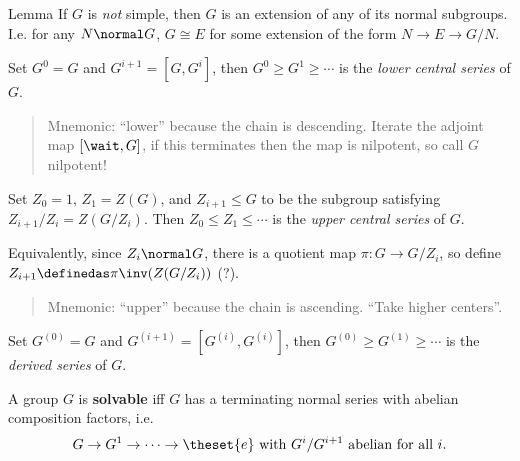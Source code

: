 Lemma If \(G\) is \emph{not} simple, then \(G\) is an extension of any
of its normal subgroups. I.e. for any \(N\normal G\), \(G \cong E\) for
some extension of the form \(N\to E\to G/N\).

\begin{definition}

Set \(G^0 = G\) and \(G^{i+1} = [G, G^i]\), then
\(G^0 \geq G^1 \geq \cdots\) is the \emph{lower central series} of
\(G\).

\end{definition}

\begin{quote}
Mnemonic: ``lower'' because the chain is descending. Iterate the adjoint
map \([\wait, G]\), if this terminates then the map is nilpotent, so
call \(G\) nilpotent!
\end{quote}

\begin{definition}

Set \(Z_0 = 1\), \(Z_1 = Z(G)\), and \(Z_{i+1} \leq G\) to be the
subgroup satisfying \(Z_{i+1}/Z_i = Z(G/Z_i)\). Then
\(Z_0 \leq Z_1 \leq \cdots\) is the \emph{upper central series} of
\(G\).

Equivalently, since \(Z_i\normal G\), there is a quotient map
\(\pi:G\to G/Z_i\), so define \(Z_{i+1} \definedas \pi\inv(Z(G/Z_i))\)
(?).

\begin{quote}
Mnemonic: ``upper'' because the chain is ascending. ``Take higher
centers''.
\end{quote}

\end{definition}

\begin{definition}

Set \(G^{(0)} = G\) and \(G^{(i+1)} = [G^{(i)}, G^{(i)}]\), then
\(G^{(0)} \geq G^{(1)} \geq \cdots\) is the \emph{derived series} of
\(G\).

\end{definition}

\begin{definition}[Solvable]

A group \(G\) is \textbf{solvable} iff \(G\) has a terminating normal
series with abelian composition factors, i.e.
\begin{align*}
  G \to G^1 \to \cdots \to \theset{e} \text{ with } G^{i}/G^{i+1}\text{ abelian for all } i
  .\end{align*}

\end{definition}


